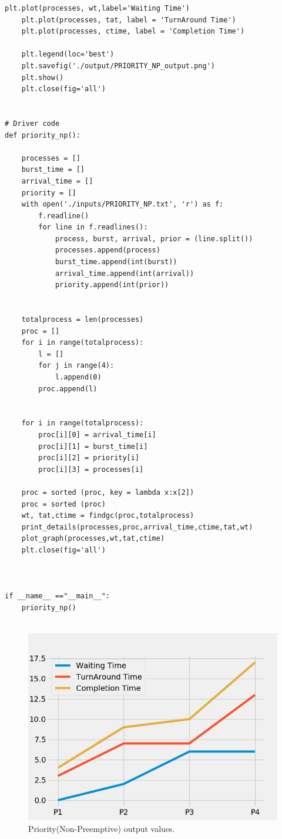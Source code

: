 \documentclass[11pt,a4paper]{report}
\begin{document}
\begin{lstlisting}[columns=fullflexible,caption=Priorty(Non-Preemptive) Source code,breaklines=true,postbreak=\mbox{\textcolor{red}{$\hookrightarrow$}\space},]
	plt.plot(processes, wt,label='Waiting Time')
	plt.plot(processes, tat, label = 'TurnAround Time')
	plt.plot(processes, ctime, label = 'Completion Time')

	plt.legend(loc='best')
	plt.savefig('./output/PRIORITY_NP_output.png')
	plt.show()
	plt.close(fig='all')


# Driver code  
def priority_np():

	processes = []
	burst_time = []
	arrival_time = []
	priority = []
	with open('./inputs/PRIORITY_NP.txt', 'r') as f:
		f.readline()
		for line in f.readlines():
			process, burst, arrival, prior = (line.split())
			processes.append(process)
			burst_time.append(int(burst))
			arrival_time.append(int(arrival))
			priority.append(int(prior)) 
	

	totalprocess = len(processes)
	proc = []
	for i in range(totalprocess): 
		l = [] 
		for j in range(4): 
			l.append(0) 
		proc.append(l) 
	
	
	for i in range(totalprocess):
		proc[i][0] = arrival_time[i]
		proc[i][1] = burst_time[i]
		proc[i][2] = priority[i]
		proc[i][3] = processes[i]

	proc = sorted (proc, key = lambda x:x[2]) 
	proc = sorted (proc) 
	wt, tat,ctime = findgc(proc,totalprocess) 
	print_details(processes,proc,arrival_time,ctime,tat,wt)
	plot_graph(processes,wt,tat,ctime)
	plt.close(fig='all')
	


if __name__ =="__main__": 
	priority_np()
	
\end{lstlisting}

{\begin{figure}[H]
	\centering
	\includegraphics[scale=0.75]{./img/PRIORITY_NP_output.png}
	\caption{Priority(Non-Preemptive) output values.}
\end{figure}}
\end{document}
